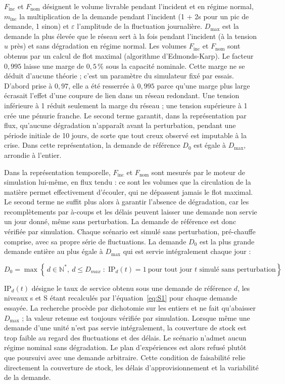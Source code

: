 $F_{\mathrm{inc}}$ et $F_{\mathrm{nom}}$ désignent le volume livrable pendant l'incident et en régime normal, $m_{\mathrm{inc}}$ la multiplication de la demande pendant l'incident (1 + 2s pour un pic de demande, 1 sinon) et $\varepsilon$ l'amplitude de la fluctuation journalière. $D_{\max}$ est la demande la plus élevée que le réseau sert à la fois pendant l'incident (à la tension $u$ près) et sans dégradation en régime normal. Les volumes $F_{\mathrm{inc}}$ et $F_{\mathrm{nom}}$ sont obtenus par un calcul de flot maximal (algorithme d'Edmonds-Karp). Le facteur $0{,}995$ laisse une marge de $0{,}5\,\%$ sous la capacité nominale. Cette marge ne se déduit d'aucune théorie ; c'est un paramètre du simulateur fixé par essais. D'abord prise à $0{,}97$, elle a été resserrée à $0{,}995$ parce qu'une marge plus large écrasait l'effet d'une coupure de lien dans un réseau redondant. Une tension inférieure à 1 réduit seulement la marge du réseau ; une tension supérieure à 1 crée une pénurie franche. Le second terme garantit, dans la représentation par flux, qu'aucune dégradation n'apparaît avant la perturbation, pendant une période initiale de 10 jours, de sorte que tout creux observé est imputable à la crise. Dans cette représentation, la demande de référence $D_{0}$ est égale à $D_{\max}$, arrondie à l'entier.

Dans la représentation temporelle, $F_{\mathrm{inc}}$ et $F_{\mathrm{nom}}$ sont mesurés par le moteur de simulation lui-même, en flux tendu : ce sont les volumes que la circulation de la matière permet effectivement d'écouler, qui ne dépassent jamais le flot maximal. Le second terme ne suffit plus alors à garantir l'absence de dégradation, car les recomplètements par à-coups et les délais peuvent laisser une demande non servie un jour donné, même sans perturbation. La demande de référence est donc vérifiée par simulation. Chaque scénario est simulé sans perturbation, pré-chauffe comprise, avec sa propre série de fluctuations. La demande $D_{0}$ est la plus grande demande entière au plus égale à $D_{\max}$ qui est servie intégralement chaque jour :

\begin{equation}
D_0 = \max\left\{\, d \in \mathbb{N}^*,\ d \le D_{max} \;:\; \mathrm{IP}_d(t) = 1 \ \text{pour tout jour } t \text{ simulé sans perturbation} \right\}
\label{eq:S3}
\end{equation}

$\mathrm{IP}_{d}(t)$ désigne le taux de service obtenu sous une demande de référence $d$, les niveaux s et S étant recalculés par l'équation~\eqref{eq:S1} pour chaque demande essayée. La recherche procède par dichotomie sur les entiers et ne fait qu'abaisser $D_{\max}$ ; la valeur retenue est toujours vérifiée par simulation. Lorsque même une demande d'une unité n'est pas servie intégralement, la couverture de stock est trop faible au regard des fluctuations et des délais. Le scénario n'admet aucun régime nominal sans dégradation. Le plan d'expériences est alors refusé plutôt que poursuivi avec une demande arbitraire. Cette condition de faisabilité relie directement la couverture de stock, les délais d'approvisionnement et la variabilité de la demande.

